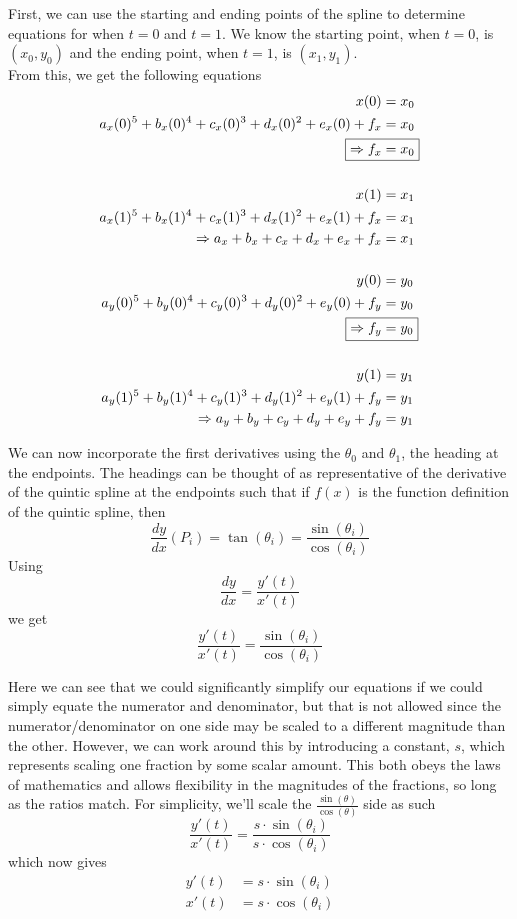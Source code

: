 \documentclass[12pt, letterpaper]{article}
\begin{document}
\newpage
First, we can use the starting and ending points of the spline to determine equations for when \(t = 0\) and \(t = 1\). We know the starting point, when \(t = 0\), is \((x_0, y_0)\) and the ending point, when \(t = 1\), is \((x_1, y_1)\). \\

From this, we get the following equations 
\begin{align}
x(0) &= x_0 \nonumber \\
a_x (0)^5 + b_x (0)^4 + c_x (0)^3 + d_x (0)^2 + e_x (0) + f_x &= x_0 \nonumber \\
\Aboxed{\Rightarrow f_x &= x_0} \\
\nonumber \\
x(1) &= x_1 \nonumber \\
a_x (1)^5 + b_x (1)^4 + c_x (1)^3 + d_x (1)^2 + e_x (1) + f_x &= x_1 \nonumber \\
\Rightarrow a_x + b_x + c_x + d_x + e_x + f_x &= x_1 \\
\nonumber \\
y(0) &= y_0 \nonumber \\
a_y (0)^5 + b_y (0)^4 + c_y (0)^3 + d_y (0)^2 + e_y (0) + f_y &= y_0 \nonumber \\
\Aboxed{\Rightarrow f_y &= y_0} \\
\nonumber \\
y(1) &= y_1 \nonumber \\
a_y (1)^5 + b_y (1)^4 + c_y (1)^3 + d_y (1)^2 + e_y (1) + f_y &= y_1 \nonumber \\
\Rightarrow a_y + b_y + c_y + d_y + e_y + f_y &= y_1
\end{align}

We can now incorporate the first derivatives using the \(\theta_0\) and \(\theta_1\), the heading at the endpoints. The headings can be thought of as representative of the derivative of the quintic spline at the endpoints such that if \(f(x)\) is the function definition of the quintic spline, then \[\frac{dy}{dx}(P_i) = \tan(\theta_i) = \frac{\sin(\theta_i)}{\cos(\theta_i)}\] Using \[\frac{dy}{dx} = \frac{y'(t)}{x'(t)}\] we get \[\frac{y'(t)}{x'(t)} = \frac{\sin(\theta_i)}{\cos(\theta_i)}\]

Here we can see that we could significantly simplify our equations if we could simply equate the numerator and denominator, but that is not allowed since the numerator/denominator on one side may be scaled to a different magnitude than the other. However, we can work around this by introducing a constant, \(s\), which represents scaling one fraction by some scalar amount. This both obeys the laws of mathematics and allows flexibility in the magnitudes of the fractions, so long as the ratios match. For simplicity, we'll scale the \(\frac{\sin(\theta)}{\cos(\theta)}\) side as such
\[\frac{y'(t)}{x'(t)} = \frac{s \cdot \sin(\theta_i)}{s \cdot \cos(\theta_i)}\]
which now gives 
\begin{align*}
y'(t) &= s \cdot \sin(\theta_i) \\
x'(t) &= s \cdot \cos(\theta_i)
\end{align*}
\end{document}
